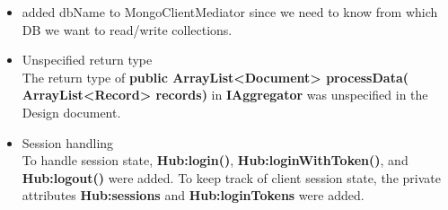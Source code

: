\documentclass[oneside, english, final]{design}
\begin{document}
\begin{itemize}
  \item{added dbName to MongoClientMediator since we need to know from which DB we want to read/write collections.}
\\


  \item{Unspecified return type}
    \\
    The return type of \textsf{\textbf{public ArrayList<Document> processData( ArrayList<Record> records)}} in \textsf{\textbf{IAggregator}}
was unspecified in the Design document.

  \item{Session handling}
    \\
    To handle session state, \textsf{\textbf{Hub:login()}}, \textsf{\textbf{Hub:loginWithToken()}}, and \textsf{\textbf{Hub:logout()}} were added.
    To keep track of client session state, the private attributes \textsf{\textbf{Hub:sessions}} and \textsf{\textbf{Hub:loginTokens}} were added.

\end{itemize}
\end{document}
